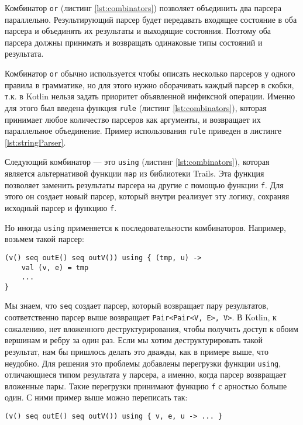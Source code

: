 Комбинатор \verb|or| (листинг \ref{lst:combinators}) позволяет объединить два парсера параллельно.
Результирующий парсер будет передавать входящее состояние в оба парсера и объединять их результаты и выходящие состояния.
Поэтому оба парсера должны принимать и возвращать одинаковые типы состояний и результата.

Комбинатор \verb|or| обычно используется чтобы описать несколько парсеров у одного правила в грамматике, но для этого нужно оборачивать каждый парсер в скобки, т.к. в Kotlin нельзя задать приоритет объявленной инфиксной операции. Именно для этого был введена функция \verb|rule| (листинг \ref{lst:combinators}), которая принимает любое количество парсеров как аргументы, и возвращает их параллельное объединение. Пример использования \verb|rule| приведен в листинге \ref{lst:stringParser}.

Следующий комбинатор --- это \verb|using| (листинг \ref{lst:combinators}), которая является альтернативой функции \texttt{map} из библиотеки Trails. Эта функция позволяет заменить результаты парсера на другие с помощью функции \verb|f|.
Для этого он создает новый парсер, который внутри реализует эту логику, сохраняя исходный парсер и функцию \verb|f|.

Но иногда \verb|using| применяется к последовательности комбинаторов.
Например, возьмем такой парсер:

\begin{nobreaks}
    \begin{lstlisting}
(v() seq outE() seq outV()) using { (tmp, u) -> 
    val (v, e) = tmp
    ... 
}
\end{lstlisting}
\end{nobreaks}

Мы знаем, что \verb|seq| создает парсер, который возвращает пару результатов, соответственно парсер выше возвращает \verb|Pair<Pair<V, E>, V>|.
В Kotlin, к сожалению, нет вложенного деструктурирования, чтобы получить доступ к обоим вершинам и ребру за один раз.
Если мы хотим деструктурировать такой результат, нам бы пришлось делать это дважды, как в примере выше, что неудобно.
Для решения это проблемы добавлены перегрузки функции \verb|using|, отличающиеся типом результата у парсера, а именно, когда парсер возвращает вложенные пары. Такие перегрузки принимают функцию \verb|f| с арностью больше один. С ними пример выше можно переписать так:
\begin{lstlisting}
(v() seq outE() seq outV()) using { v, e, u -> ... }
\end{lstlisting}

